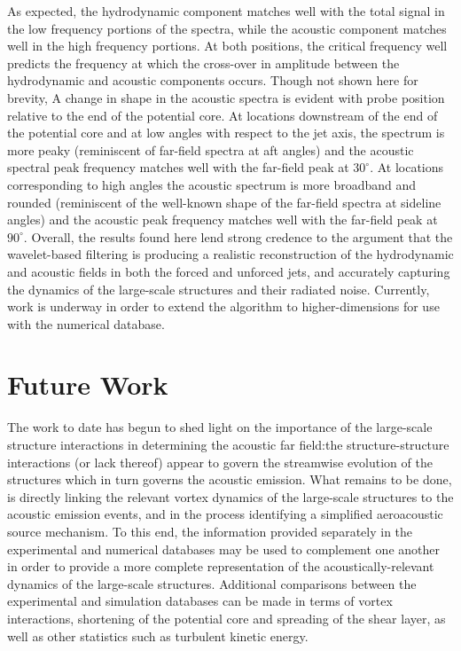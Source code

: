 \documentclass[english]{aiaa-tc}
\begin{document}
As expected, the hydrodynamic component matches well with the total signal in the low frequency portions of the spectra, while the acoustic component matches well in the high frequency portions. At both positions, the critical frequency well predicts the frequency at which the cross-over in amplitude between the hydrodynamic and acoustic components occurs. Though not shown here for brevity, A change in shape in the acoustic spectra is evident with probe position relative to the end of the potential core. At locations downstream of the end of the potential core and at low angles with respect to the jet axis, the spectrum is more peaky (reminiscent of far-field spectra at aft angles) and the acoustic spectral peak frequency matches well with the far-field peak at $30^{\circ}$. At locations corresponding to high angles the acoustic spectrum is more broadband and rounded (reminiscent of the well-known shape of the far-field spectra at sideline angles) and the acoustic peak frequency matches well with the far-field peak at $90^{\circ}$. Overall, the results found here lend strong credence to the argument that the wavelet-based filtering is producing a realistic reconstruction of the hydrodynamic and acoustic fields in both the forced and unforced jets, and accurately capturing the dynamics of the large-scale structures and their radiated noise. Currently, work is underway in order to extend the algorithm to higher-dimensions for use with the numerical database.

\section{Future Work}
The work to date has begun to shed light on the importance of the large-scale structure interactions in determining the acoustic far field:the structure-structure interactions (or lack thereof) appear to govern the streamwise evolution of the structures which in turn governs the acoustic emission. What remains to be done, is directly linking the relevant vortex dynamics of the large-scale structures to the acoustic emission events, and in the process identifying a simplified aeroacoustic source mechanism. To this end, the information provided separately in the experimental and numerical databases may be used to complement one another in order to provide a more complete representation of the acoustically-relevant dynamics of the large-scale structures. Additional comparisons between the experimental and simulation databases can be made in terms of vortex interactions, shortening of the potential core and spreading of the shear layer, as well as other statistics such as turbulent kinetic energy.
\end{document}
